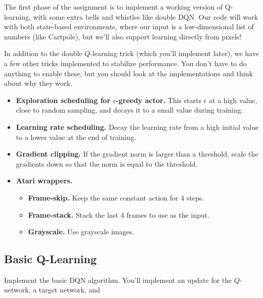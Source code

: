 The first phase of the assignment is to implement a working version of Q-learning, with some extra bells and whistles like double DQN. Our code will work with both state-based environments, where our input is a low-dimensional list of numbers (like Cartpole), but we'll also support learning directly from pixels!

In addition to the double $Q$-learning trick (which you'll implement later), we have a few other tricks implemented to stabilize performance. You don't have to do anything to enable these, but you should look at the implementations and think about why they work.
\begin{itemize}
    \item \textbf{Exploration scheduling for $\epsilon$-greedy actor.} This starts $\epsilon$ at a high value, close to random sampling, and decays it to a small value during training.
    \item \textbf{Learning rate scheduling.} Decay the learning rate from a high initial value to a lower value at the end of training.
    \item \textbf{Gradient clipping.} If the gradient norm is larger than a threshold, scale the gradients down so that the norm is equal to the threshold.
    \item \textbf{Atari wrappers.}
    \begin{itemize}
        \item \textbf{Frame-skip.} Keep the same constant action for 4 steps.
        \item \textbf{Frame-stack.} Stack the last 4 frames to use as the input.
        \item \textbf{Grayscale.} Use grayscale images.
    \end{itemize}
\end{itemize}

\subsection{Basic Q-Learning}

Implement the basic DQN algorithm. You'll implement an update for the $Q$-network, a target network, and 

